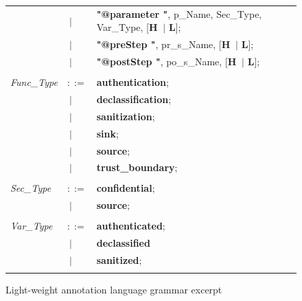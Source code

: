 \begin{figure}[ht!]
\begin{tabular}{lll}
		&\footnotesize $\ \vert $    &\footnotesize \textbf{"@parameter "},   p\_Name,  Sec\_Type, Var\_Type,    [\textbf{H} $\ \vert $  \textbf{L}];    \\
		&\footnotesize $\ \vert $    &\footnotesize \textbf{"@preStep "},     pr\_s\_Name,             [\textbf{H} $\ \vert $  \textbf{L}];    \\
		&\footnotesize $\ \vert $    &\footnotesize \textbf{"@postStep "},    po\_s\_Name,             [\textbf{H} $\ \vert $  \textbf{L}];    \\ \\                                        
		\footnotesize                       
		\textit{Func\_Type}          &\footnotesize $::=$        &\footnotesize \textbf{authentication};\\
		 &\footnotesize $\ \vert $ &\footnotesize \textbf{declassification}; \\
		&\footnotesize $\ \vert $    &\footnotesize \textbf{sanitization};     \\
		&\footnotesize $\ \vert $    &\footnotesize \textbf{sink};             \\
		&\footnotesize $\ \vert $    &\footnotesize \textbf{source};           \\
		&\footnotesize $\ \vert $    &\footnotesize \textbf{trust\_boundary};  \\ \\
		\footnotesize                       
		\textit{Sec\_Type}           &\footnotesize $::=$         &\footnotesize \textbf{confidential}; \\
		&\footnotesize $\ \vert $    &\footnotesize \textbf{source};    \\ \\
		\footnotesize                       
		\textit{Var\_Type}           &\footnotesize $::=$         &\footnotesize \textbf{authenticated}; \\
		&\footnotesize $\ \vert $    &\footnotesize \textbf{declassified}
		\\
		&\footnotesize $\ \vert $    &\footnotesize \textbf{sanitized};    \\ \\	
		                       
	\end{tabular}
	\caption{Light-weight annotation language grammar excerpt}
	\label{language grammar}
\end{figure}

